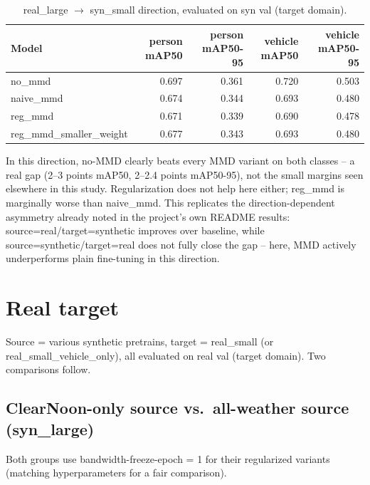 \documentclass[11pt]{article}
\begin{document}
\begin{table}[h!]
    \centering
    \setlength{\tabcolsep}{5pt}
    \begin{tabular}{lrrrr}
        \toprule
        Model & person mAP50 & person mAP50-95 & vehicle mAP50 & vehicle mAP50-95 \\
        \midrule
        no\_mmd & 0.697 & 0.361 & 0.720 & 0.503 \\
        naive\_mmd & 0.674 & 0.344 & 0.693 & 0.480 \\
        reg\_mmd & 0.671 & 0.339 & 0.690 & 0.478 \\
        reg\_mmd\_smaller\_weight & 0.677 & 0.343 & 0.693 & 0.480 \\
        \bottomrule
    \end{tabular}
    \caption{real\_large $\to$ syn\_small direction, evaluated on syn val (target domain).}
\end{table}

\noindent In this direction, no-MMD clearly beats every MMD variant on both classes --
a real gap (2--3 points mAP50, 2--2.4 points mAP50-95), not the small margins seen
elsewhere in this study. Regularization does not help here either; reg\_mmd is
marginally worse than naive\_mmd. This replicates the direction-dependent asymmetry
already noted in the project's own README results: source=real/target=synthetic
improves over baseline, while source=synthetic/target=real does not fully close the
gap -- here, MMD actively underperforms plain fine-tuning in this direction.

\section{Real target}

Source = various synthetic pretrains, target = real\_small (or real\_small\_vehicle\_only),
all evaluated on real val (target domain). Two comparisons follow.

\subsection{ClearNoon-only source vs.\ all-weather source (syn\_large)}

Both groups use bandwidth-freeze-epoch = 1 for their regularized variants (matching
hyperparameters for a fair comparison).
\end{document}
